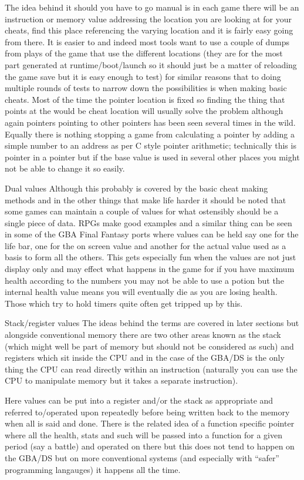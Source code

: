 \documentclass[
]{book}
\begin{document}
The idea behind it should you have to go manual is in each game there will be an instruction or memory value addressing the location you are looking at for your cheats, find this place referencing the varying location and it is fairly easy going from there. It is easier to and indeed most tools want to use a couple of dumps from plays of the game that use the different locations (they are for the most part generated at runtime/boot/launch so it should just be a matter of reloading the game save but it is easy enough to test) for similar reasons that to doing multiple rounds of tests to narrow down the possibilities is when making basic cheats. Most of the time the pointer location is fixed so finding the thing that points at the would be cheat location will usually solve the problem although again pointers pointing to other pointers has been seen several times in the wild. Equally there is nothing stopping a game from calculating a pointer by adding a simple number to an address as per C style pointer arithmetic; technically this is pointer in a pointer but if the base value is used in several other places you might not be able to change it so easily.

Dual values Although this probably is covered by the basic cheat making methods and in the other things that make life harder it should be noted that some games can maintain a couple of values for what ostensibly should be a single piece of data. RPGs make good examples and a similar thing can be seen in some of the GBA Final Fantasy ports where values can be held say one for the life bar, one for the on screen value and another for the actual value used as a basis to form all the others. This gets especially fun when the values are not just display only and may effect what happens in the game for if you have maximum health according to the numbers you may not be able to use a potion but the internal health value means you will eventually die as you are losing health. Those which try to hold timers quite often get tripped up by this.

Stack/register values The ideas behind the terms are covered in later sections but alongside conventional memory there are two other areas known as the stack (which might well be part of memory but should not be considered as such) and registers which sit inside the CPU and in the case of the GBA/DS is the only thing the CPU can read directly within an instruction (naturally you can use the CPU to manipulate memory but it takes a separate instruction).

Here values can be put into a register and/or the stack as appropriate and referred to/operated upon repeatedly before being written back to the memory when all is said and done. There is the related idea of a function specific pointer where all the health, stats and such will be passed into a function for a given period (say a battle) and operated on there but this does not tend to happen on the GBA/DS but on more conventional systems (and especially with ``safer'' programming langauges) it happens all the time.
\end{document}

